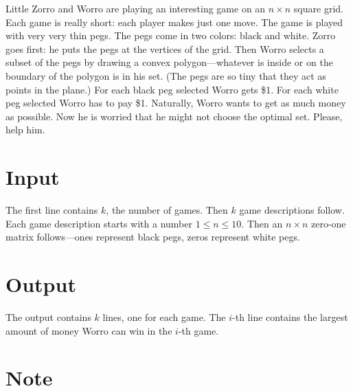 
Little Zorro and Worro are playing an interesting game on an
$n\times n$ square grid. Each game is really short: each player makes just one move.
The game is played with very very thin
pegs. The pegs come in two colors: black and white. Zorro goes
first: he puts the pegs at the vertices of the grid. Then Worro
selects a subset of the pegs by drawing a convex
polygon---whatever is inside or on the boundary of the polygon is
in his set. (The pegs are so tiny that they act as points in the plane.)
For each black peg selected Worro gets \$1. For each
white peg selected Worro has to pay \$1. Naturally, Worro wants to
get as much money as possible. Now he is worried that he might not
choose the optimal set. Please, help him.

\section*{Input}
The first line contains $k$, the number of games. Then $k$ game
descriptions follow. Each game description starts with a number
$1\le n\le 10$. Then an $n\times n$ zero-one matrix
follows---ones represent black pegs, zeros represent white pegs.

\section*{Output}
The output contains $k$ lines, one for each game. The $i$-th line
contains the largest amount of money Worro can win in the $i$-th
game.

\section*{Note}

